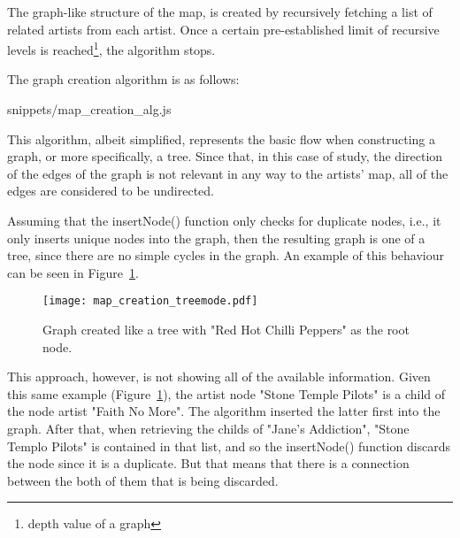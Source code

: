       The graph-like structure of the map, is created by recursively fetching a list of related artists from each artist. Once a certain pre-established limit of recursive levels is reached\footnote{depth value of a graph}, the algorithm stops.

      The graph creation algorithm is as follows:

      
      {snippets/map_creation_alg.js}

      This algorithm, albeit simplified, represents the basic flow when constructing a graph, or more specifically, a tree.
      Since that, in this case of study, the direction of the edges of the graph is not relevant in any way to the artists' map, all of the edges are considered to be undirected.

      Assuming that the insertNode() function only checks for duplicate nodes, i.e., it only inserts unique nodes into the graph, then the resulting graph is one of a tree, since there are no simple cycles in the graph.
      An example of this behaviour can be seen in Figure~\ref{fig:graph_treemode}.

      \begin{figure}[tb]
        \begin{center}
          \texttt{[image: map\_creation\_treemode.pdf]}
        \end{center}
        \caption{Graph created like a tree with "Red Hot Chilli Peppers" as the root node.}
        \label{fig:graph_treemode}
      \end{figure}

      This approach, however, is not showing all of the available information.
      Given this same example (Figure~\ref{fig:graph_treemode}), the artist node "Stone Temple Pilots" is a child of the node artist "Faith No More".
      The algorithm inserted the latter first into the graph.
      After that, when retrieving the childs of "Jane's Addiction", "Stone Templo Pilots" is contained in that list, and so the insertNode() function discards the node since it is a duplicate.
      But that means that there is a connection between the both of them that is being discarded.

